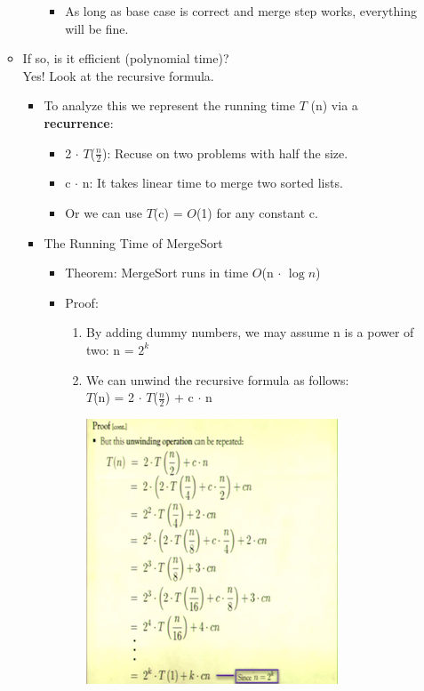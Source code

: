 \documentclass[12pt]{article}
\begin{document}
\begin{itemize}
\begin{itemize}
\begin{itemize}
\begin{itemize}
			\item As long as base case is correct and merge step works, everything will be fine.
			\end{itemize}
		\end{itemize}
	\item If so, is it efficient (polynomial time)?\\
	\noindent Yes! Look at the recursive formula.
		\begin{itemize}
		\item To analyze this we represent the running time $T$ (n) via a \textbf{recurrence}:\\
		\hspace*{\fill} 
			\begin{itemize}
			\item 2 $\cdot$ $T$($\frac{n}{2}$): Recuse on two problems with half the size.
			\item c $\cdot$ n: It takes linear time to merge two sorted lists.
			\end{itemize}
		\hspace*{\fill}{\large Base Case: $T$(1) = 1}\hspace*{\fill} 
			\begin{itemize}
			\item Or we can use $T$(c) = $O$(1) for any constant c.
			\end{itemize}
		\item The Running Time of MergeSort
			\begin{itemize}
			\item Theorem: MergeSort runs in time $O$(n $\cdot$ $\log{}n$)
			\item Proof: 
				\begin{enumerate}
				\item By adding dummy numbers, we may assume n is a power of two: n = 						$2^k$
				\item We can unwind the recursive formula as follows:\\
				\hspace*{\fill}\large{$T$(n) = 2 $\cdot$ $T$($\frac{n}{2}$) + c $\cdot$ n}\hspace*{\fill}
				\begin{center}
				\includegraphics{lecture2b}

\end{center}
\end{enumerate}
\end{itemize}
\end{itemize}
\end{itemize}
\end{itemize}
\end{document}

